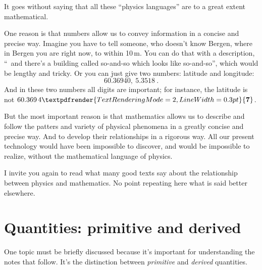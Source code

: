 \documentclass[a4paper,12pt,%
onecolumn,oneside,%
british%
]{memoir}
\renewcommand*{\bm}[1]{\textpdfrender{TextRenderingMode=2,LineWidth=0.3pt}{\boldsymbol{#1}}}
\renewcommand*{\|}[1][]{\nonscript\:#1\vert\nonscript\:\mathopen{}}
\begin{document}
\medskip

It goes without saying that all these \enquote{physics languages} are to a great extent mathematical.

One reason is that numbers allow us to convey information in a concise and precise way. Imagine you have to tell someone, who doesn't know
Bergen, where in Bergen you are right now, to within 10\,m. You can do that with a description, \enquote{\textellipsis\ and there's a building called so-and-so which looks like so-and-so\textellipsis}, which would be lengthy and tricky. Or you can just give two numbers: latitude and longitude:
\begin{equation*}
  \num{60.36940},\ \num{5.3518} \ .
\end{equation*}
And in these two numbers all digits are important; for instance, the latitude is not \ensuremath{60.369\,4\bm{7}}.

But the most important reason is that mathematics allows us to describe and follow the patters and variety of physical phenomena in a greatly concise and precise way. And to develop their relationships in a rigorous way.
All our present technology would have been impossible to discover, and would be impossible to realize, without the mathematical language of physics.

I invite you again to read what many good texts say about the relationship between physics and mathematics. No point repeating here what is said better elsewhere.

\section{Quantities: primitive and derived}
\label{sec:primitives}

One topic must be briefly discussed because it's important for understanding the notes that follow. It's the distinction between \emph{primitive} and \emph{derived} quantities.
\end{document}
